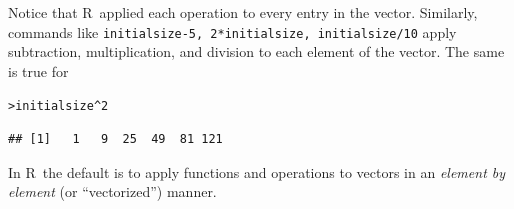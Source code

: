 \documentclass[11pt]{article}\usepackage[]{graphicx}\usepackage[]{color}
\makeatletter
\newcommand{\hlnum}[1]{\textcolor[rgb]{0.686,0.059,0.569}{#1}}%
\newcommand{\hlopt}[1]{\textcolor[rgb]{0,0,0}{#1}}%
\newcommand{\hlstd}[1]{\textcolor[rgb]{0.345,0.345,0.345}{#1}}%
\newenvironment{kframe}{%
 \def\at@end@of@kframe{}%
 \ifinner\ifhmode%
  \def\at@end@of@kframe{\end{minipage}}%
  \begin{minipage}{\columnwidth}%
 \fi\fi%
 \def\FrameCommand##1{\hskip\@totalleftmargin \hskip-\fboxsep
 \colorbox{shadecolor}{##1}\hskip-\fboxsep
     \hskip-\linewidth \hskip-\@totalleftmargin \hskip\columnwidth}%
 \MakeFramed {\advance\hsize-\width
   \@totalleftmargin\z@ \linewidth\hsize
   \@setminipage}}%
 {\par\unskip\endMakeFramed%
 \at@end@of@kframe}
\newenvironment{knitrout}{}{} %
\newcommand{\code}[1]{{\tt #1}}
\newcommand\R{{\sf R}}
\numberwithin{exercise}{section}
\makeatother
\begin{document}
Notice that \R\ applied each operation to every entry in the vector. 
Similarly, commands like \code{initialsize-5, 2*initialsize, initialsize/10} 
apply subtraction, multiplication, and division to each element of the 
vector. The same is true for 
\begin{knitrout}
\color{fgcolor}\begin{kframe}
\begin{alltt}
\hlstd{> }\hlstd{initialsize}\hlopt{^}\hlnum{2}
\end{alltt}
\begin{verbatim}
## [1]   1   9  25  49  81 121
\end{verbatim}
\end{kframe}
\end{knitrout}

In \R\ the default is to apply functions and operations to vectors
in an \emph{element by element} (or ``vectorized'') manner. 
\end{document}
